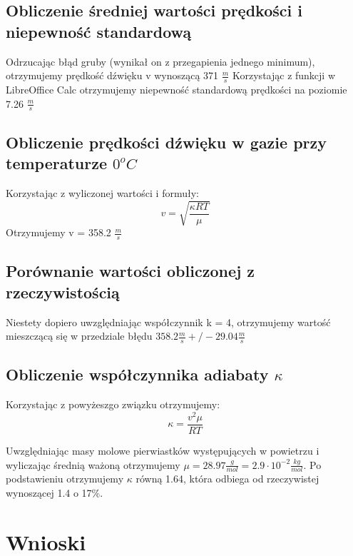 \documentclass{article}
\begin{document}
\subsection{Obliczenie średniej wartości prędkości i niepewność standardową}
Odrzucając błąd gruby (wynikał on z przegapienia jednego minimum), otrzymujemy prędkość dźwięku v wynoszącą 371 $\frac{m}{s}$
Korzystając z funkcji w LibreOffice Calc otrzymujemy niepewność standardową prędkości na poziomie 7.26 $\frac{m}{s}$

\subsection{Obliczenie prędkości dźwięku w gazie przy temperaturze $0^{o} C$}
Korzystając z wyliczonej wartości i formuły:
\begin{equation}
	v = \sqrt{\frac{\kappa RT}{\mu}}
\end{equation}
Otrzymujemy v = 358.2 $\frac{m}{s}$

\subsection{Porównanie wartości obliczonej z rzeczywistością}
Niestety dopiero uwzględniając współczynnik k = 4, otrzymujemy wartość mieszczącą się w przedziale błędu $358.2 \frac{m}{s} +/- 29.04 \frac{m}{s}$

\subsection{Obliczenie współczynnika adiabaty $\kappa$}

Korzystając z powyżeszgo związku otrzymujemy:
\begin{equation}
	\kappa = \frac{v^{2}\mu}{RT}
\end{equation}

Uwzględniając masy molowe pierwiastków występujących w powietrzu i wyliczając średnią ważoną otrzymujemy $\mu = 28.97 \frac{g}{mol} = 2.9 \cdot 10^{-2} \frac{kg}{mol}$. Po podstawieniu otrzymujemy $\kappa$ równą 1.64, która odbiega od rzeczywistej wynoszącej 1.4 o 17\%.
\section{Wnioski}
\end{document}
